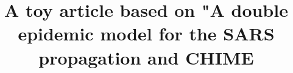 \documentclass{bmcart}
\begin{document}
\begin{frontmatter}

\begin{fmbox}


\title{A toy article based on "A double epidemic model for the SARS propagation and CHIME}


\author[
   addressref={aff1},                   %
   noteref={n1},                        %
   email={toy_email@arizona.edu}   %
]{ }


\address[id=aff1]{%
  , %
  ,                              %
}




\end{fmbox}
\end{frontmatter}
\end{document}
